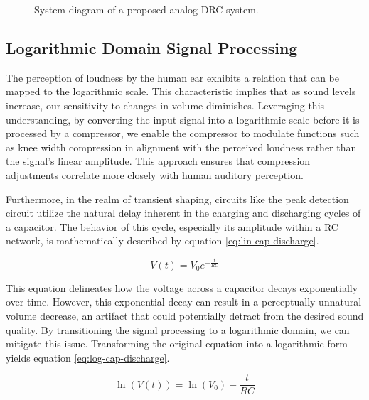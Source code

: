 \documentclass[10pt]{article}
\begin{document}
\begin{multicols*}{2}
\begin{figure}[!th]
                        \caption{System diagram of a proposed analog DRC system.}
                        \label{fig:drc-diagram}

                    \end{figure}
    
            \subsection{Logarithmic Domain Signal Processing}
                The perception of loudness by the human ear exhibits a relation that can be mapped to the logarithmic scale. This characteristic implies that as sound levels increase, our sensitivity to changes in volume diminishes. Leveraging this understanding, by converting the input signal into a logarithmic scale before it is processed by a compressor, we enable the compressor to modulate functions such as knee width compression in alignment with the perceived loudness rather than the signal's linear amplitude. This approach ensures that compression adjustments correlate more closely with human auditory perception.\par
                Furthermore, in the realm of transient shaping, circuits like the peak detection circuit utilize the natural delay inherent in the charging and discharging cycles of a capacitor. The behavior of this cycle, especially its amplitude within a RC network, is mathematically described by equation \ref{eq:lin-cap-discharge}.
                
                    \begin{equation}\label{eq:lin-cap-discharge}
                        V(t) = V_0 e^{-\frac{t}{RC}}
                    \end{equation}    
                
                \noindent This equation delineates how the voltage across a capacitor decays exponentially over time. However, this exponential decay can result in a perceptually unnatural volume decrease, an artifact that could potentially detract from the desired sound quality. By transitioning the signal processing to a logarithmic domain, we can mitigate this issue. Transforming the original equation into a logarithmic form yields equation \ref{eq:log-cap-discharge}.
                
                    \begin{equation}\label{eq:log-cap-discharge}
                        \ln(V(t)) = \ln(V_0) - \frac{t}{RC}
                    \end{equation}
                

\end{multicols*}
\end{document}

